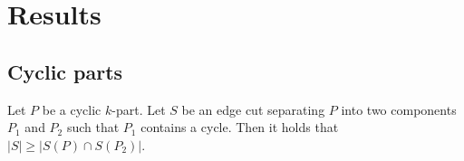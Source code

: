 \chapter{Results}\label{ch:results}

\section{Cyclic parts}\label{sec:cyclic-part-results}

\begin{lemma}
	\label{lem:cyclic-part-no-short-cut}
	Let $P$ be a cyclic $k$-part. Let $S$ be an edge cut separating $P$ into two components $P_1$ and $P_2$ such that $P_1$ contains a cycle. Then it holds that ${|S| \geq |S(P)\cap S(P_2)|}$.
\end{lemma}

